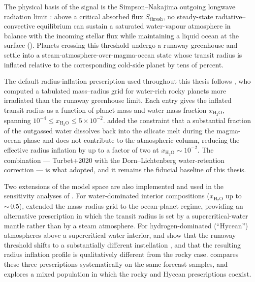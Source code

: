 The physical basis of the \HZIED signal is the Simpson--Nakajima
outgoing longwave radiation limit \parencite{Nakajima1992,Goldblatt2013}:
above a critical absorbed flux $S_\mathrm{thresh}$, no steady-state
radiative--convective equilibrium can sustain a saturated
water-vapour atmosphere in balance with the incoming stellar flux
while maintaining a liquid ocean at the surface
().  Planets crossing this threshold undergo
a runaway greenhouse and settle into a
steam-atmosphere-over-magma-ocean state whose transit radius is
inflated relative to the corresponding cold-side planet by tens of
percent.

The default radius-inflation prescription used throughout this
thesis follows \textcite{Turbet2020}, who computed a tabulated
mass--radius grid for water-rich rocky planets more irradiated than
the runaway greenhouse limit.  Each entry gives the inflated transit
radius as a function of planet mass and water mass fraction
$x_{\mathrm{H_2O}}$, spanning
$10^{-4}\leq x_{\mathrm{H_2O}}\leq 5\times 10^{-2}$.
\textcite{DornLichtenberg2021} added the constraint that a
substantial fraction of the outgassed water dissolves back into the
silicate melt during the magma-ocean phase and does not contribute
to the atmospheric column, reducing the effective radius inflation
by up to a factor of two at $x_{\mathrm{H_2O}}\sim 10^{-2}$.  The
combination --- Turbet+2020 with the Dorn--Lichtenberg
water-retention correction --- is what \textcite{Schlecker2024}
adopted, and it remains the fiducial baseline of this thesis.

Two extensions of the model space are also implemented and used in
the sensitivity analyses of .  For water-dominated
interior compositions ($x_{\mathrm{H_2O}}$ up to ${\sim}\,0.5$),
\textcite{Aguichine2021} extended the mass--radius grid to the
ocean-planet regime, providing an alternative prescription in which
the transit radius is set by a supercritical-water mantle rather
than by a steam atmosphere.  For hydrogen-dominated (``Hycean'')
atmospheres above a supercritical water interior,
\textcite{Pierrehumbert2022} and \textcite{Innes2023} show that the
runaway threshold shifts to a substantially different instellation
, and that the resulting radius
inflation profile is qualitatively different from the rocky case.
 compares these three prescriptions systematically
on the same \PLATO forecast samples, and 
explores a mixed population in which the rocky and Hycean
prescriptions coexist.


